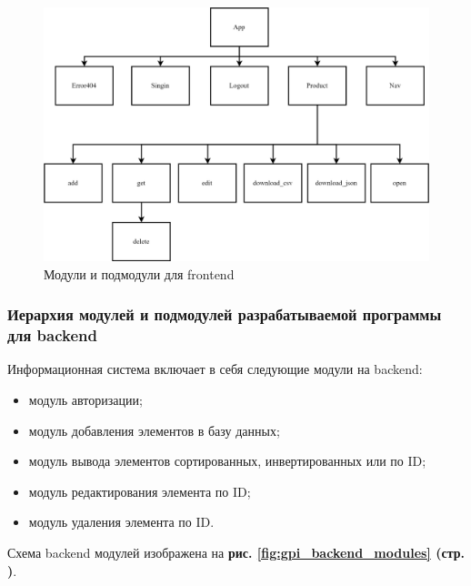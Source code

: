 \begin{figure}[!htp]
    \centering
    \includegraphics[width=16cm]
        {_assets/gpi_frontend_modules.png}
    \caption{Модули и подмодули для frontend}
    \label{fig:gpi_frontend_modules}
\end{figure}

\newpage

\subsubsection*{Иерархия модулей и подмодулей разрабатываемой программы для backend}

Информационная система включает в себя следующие модули на backend:

\begin{itemize}
    \item модуль авторизации;
    \item модуль добавления элементов в базу данных;
    \item модуль вывода элементов сортированных, инвертированных или по ID;
    \item модуль редактирования элемента по ID;
    \item модуль удаления элемента по ID.
\end{itemize}

Схема backend модулей изображена на
\textbf{рис. \ref{fig:gpi_backend_modules} (стр. \pageref{fig:gpi_backend_modules})}.

